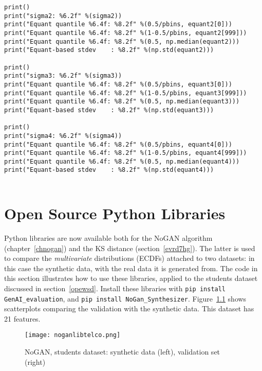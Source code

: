 \documentclass[oneside,10pt]{book}
\begin{document}
\begin{lstlisting}
print()
print("sigma2: %6.2f" %(sigma2))
print("Equant quantile %6.4f: %8.2f" %(0.5/pbins, equant2[0]))
print("Equant quantile %6.4f: %8.2f" %(1-0.5/pbins, equant2[999]))
print("Equant quantile %6.4f: %8.2f" %(0.5, np.median(equant2)))
print("Equant-based stdev    : %8.2f" %(np.std(equant2)))

print()
print("sigma3: %6.2f" %(sigma3))
print("Equant quantile %6.4f: %8.2f" %(0.5/pbins, equant3[0]))
print("Equant quantile %6.4f: %8.2f" %(1-0.5/pbins, equant3[999]))
print("Equant quantile %6.4f: %8.2f" %(0.5, np.median(equant3)))
print("Equant-based stdev    : %8.2f" %(np.std(equant3)))

print()
print("sigma4: %6.2f" %(sigma4))
print("Equant quantile %6.4f: %8.2f" %(0.5/pbins, equant4[0]))
print("Equant quantile %6.4f: %8.2f" %(1-0.5/pbins, equant4[999]))
print("Equant quantile %6.4f: %8.2f" %(0.5, np.median(equant4)))
print("Equant-based stdev    : %8.2f" %(np.std(equant4)))


\end{lstlisting}


\appendix

\chapter{Open Source Python Libraries}\label{aasdattt}

Python libraries are now available both for the NoGAN algorithm (chapter~\ref{chnogan}) 
 and the KS distance (section~\ref{evrd7hg}). 
 The latter is used to compare the {\em multivariate} distributions (ECDFs) attached to two datasets: in this case the synthetic data, with the real data
  it is generated from. The code in this section illustrates how to use these libraries, applied to the students dataset discussed in section~\ref{opewsd}. 
 Install these libraries with \texttt{pip install GenAI\_evaluation}, and \texttt{pip install NoGan\_Synthesizer}. Figure~\ref{fig:pi3qawty2xsuuvc} shows
 scatterplots comparing the validation with the synthetic data. This dataset has 21 features.



\begin{figure}[H]
\centering
\texttt{[image: noganlibtelco.png]}  
\caption{NoGAN, students dataset: synthetic data (left), validation set (right)}
\label{fig:pi3qawty2xsuuvc}
\end{figure}
\end{document}
